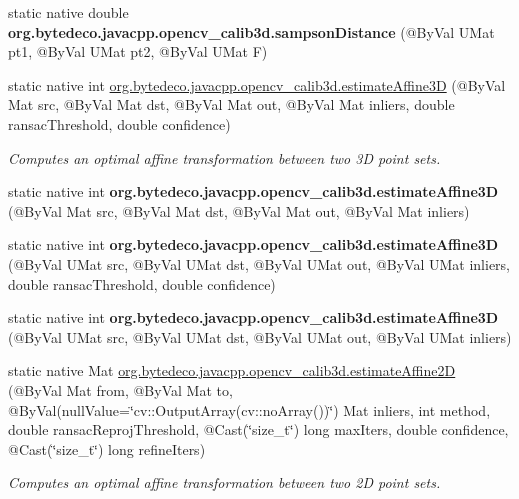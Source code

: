 \begin{DoxyCompactItemize}
\mbox{\label{group__calib3d_ga82b4b5dc0269c56d3b5981642e8870bd}} 
static native double {\bfseries org.\+bytedeco.\+javacpp.\+opencv\+\_\+calib3d.\+sampson\+Distance} (@By\+Val U\+Mat pt1, @By\+Val U\+Mat pt2, @By\+Val U\+Mat F)
\item 
static native int \hyperlink{group__calib3d_ga07eb86fa8ee181d1695f57b6b93955cd}{org.\+bytedeco.\+javacpp.\+opencv\+\_\+calib3d.\+estimate\+Affine3D} (@By\+Val Mat src, @By\+Val Mat dst, @By\+Val Mat out, @By\+Val Mat inliers, double ransac\+Threshold, double confidence)
\begin{DoxyCompactList}\small\item\em Computes an optimal affine transformation between two 3D point sets. \end{DoxyCompactList}\item 
\mbox{\label{group__calib3d_gae5e6ec58493157020514a52052ae1735}} 
static native int {\bfseries org.\+bytedeco.\+javacpp.\+opencv\+\_\+calib3d.\+estimate\+Affine3D} (@By\+Val Mat src, @By\+Val Mat dst, @By\+Val Mat out, @By\+Val Mat inliers)
\item 
\mbox{\label{group__calib3d_gac212381f062f3be447e802f607527ec1}} 
static native int {\bfseries org.\+bytedeco.\+javacpp.\+opencv\+\_\+calib3d.\+estimate\+Affine3D} (@By\+Val U\+Mat src, @By\+Val U\+Mat dst, @By\+Val U\+Mat out, @By\+Val U\+Mat inliers, double ransac\+Threshold, double confidence)
\item 
\mbox{\label{group__calib3d_gaa1bc98d9c83e43d59cac434db915b009}} 
static native int {\bfseries org.\+bytedeco.\+javacpp.\+opencv\+\_\+calib3d.\+estimate\+Affine3D} (@By\+Val U\+Mat src, @By\+Val U\+Mat dst, @By\+Val U\+Mat out, @By\+Val U\+Mat inliers)
\item 
static native Mat \hyperlink{group__calib3d_ga3ac5c98614a2c26448c68e407388473f}{org.\+bytedeco.\+javacpp.\+opencv\+\_\+calib3d.\+estimate\+Affine2D} (@By\+Val Mat from, @By\+Val Mat to, @By\+Val(null\+Value=\char`\"{}cv\+::\+Output\+Array(cv\+::no\+Array())\char`\"{}) Mat inliers, int method, double ransac\+Reproj\+Threshold, @Cast(\char`\"{}size\+\_\+t\char`\"{}) long max\+Iters, double confidence, @Cast(\char`\"{}size\+\_\+t\char`\"{}) long refine\+Iters)
\begin{DoxyCompactList}\small\item\em Computes an optimal affine transformation between two 2D point sets. \end{DoxyCompactList}\item 

\end{DoxyCompactItemize}
